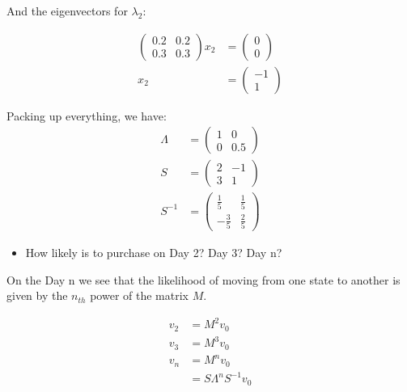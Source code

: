 \documentclass{article}
\begin{document}
And the eigenvectors for $\lambda_2$:

\begin{equation}
\begin{aligned}
\begin{pmatrix}
 0.2 & 0.2\\
 0.3 & 0.3
 \end{pmatrix}
x_2
&=
\left(
\begin{array}{c}
0\\ 
0
 \end{array}
 \right) \\
x_2 &= 
\left(
\begin{array}{c}
-1\\ 
1 
 \end{array}
 \right) 
\label{eq:mm1}
\end{aligned}
\end{equation} 

Packing up everything, we have:
\begin{equation*}
\begin{aligned}
\Lambda &=
\begin{pmatrix}
1 & 0 \\
0 & 0.5
 \end{pmatrix}  \\
S &=
\begin{pmatrix}
2 & -1 \\
3 & 1
 \end{pmatrix} \\
 S^{-1} &= 
\begin{pmatrix}
 \frac{1}{5} & \frac{1}{5}\\ 
-\frac{3}{5} & \frac{2}{5}
\end{pmatrix} 
\end{aligned}
\end{equation*} 

\begin{itemize}
\item How likely is to purchase on Day 2? Day 3? Day n?
\end{itemize} 

On the Day n we see that the likelihood of moving from one state to
another is given by the $n_{th}$ power of the matrix $M$.

\begin{equation}
\begin{aligned}
v_2 &= M^2 v_0 \\
v_3 &= M^3 v_0 \\
v_n &= M^n v_0 \\
    &=S\Lambda^n S^{-1} v_0 \\
\end{aligned}
\label{eq:vn}
\end{equation} 
\end{document}

